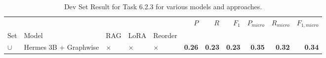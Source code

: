 \begin{table}
\caption{Dev Set Result for Task 6.2.3 for various models and approaches.}
\label{tab:task:6_2_3:test:ontug}
\begin{tabular}{lllllrrrrrr}
\toprule
 &  &  &  &  & $P$ & $R$ & $F_1$ & $P_{micro}$ & $R_{micro}$ & $F_{1,micro}$ \\
Set & Model & RAG & LoRA & Reorder &  &  &  &  &  &  \\
\midrule
$\cup$ & Hermes 3B + Graphwise & $\times$ & $\times$ & $\times$ & \textbf{0.26} & \textbf{0.23} & \textbf{0.23} & \textbf{0.35} & \textbf{0.32} & \textbf{0.34} \\
\cline{1-11} \cline{2-11} \cline{3-11} \cline{4-11} \cline{5-11}
\bottomrule
\end{tabular}
\end{table}
